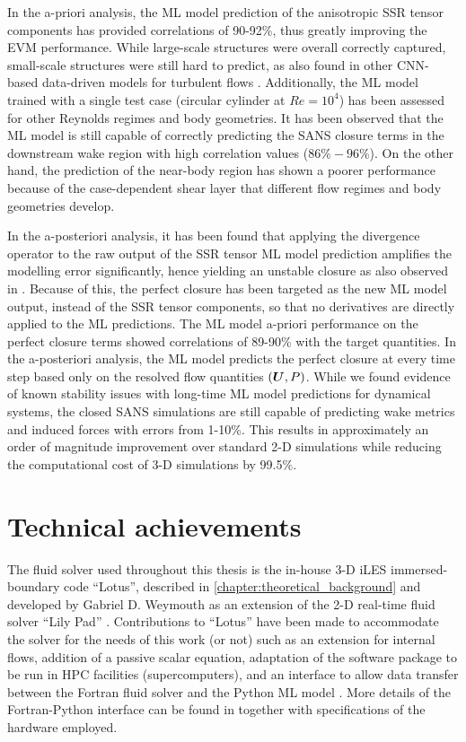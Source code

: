 \documentclass[../main.tex]{subfiles}
\begin{document}
In the a-priori analysis, the ML model prediction of the anisotropic SSR tensor components has provided correlations of 90-92\%, thus greatly improving the EVM performance.
While large-scale structures were overall correctly captured, small-scale structures were still hard to predict, as also found in other CNN-based data-driven models for turbulent flows \citep{Lee2019}.
Additionally, the ML model trained with a single test case (circular cylinder at $Re=10^4$) has been assessed for other Reynolds regimes and body geometries.
It has been observed that the ML model is still capable of correctly predicting the SANS closure terms in the downstream wake region with high correlation values ($86\%-96\%$).
On the other hand, the prediction of the near-body region has shown a poorer performance because of the case-dependent shear layer that different flow regimes and body geometries develop.

In the a-posteriori analysis, it has been found that applying the divergence operator to the raw output of the SSR tensor ML model prediction amplifies the modelling error significantly, hence yielding an unstable closure as also observed in \cite{Cruz2019}.
Because of this, the perfect closure has been targeted as the new ML model output, instead of the SSR tensor components, so that no derivatives are directly applied to the ML predictions.
The ML model a-priori performance on the perfect closure terms showed correlations of 89-90\% with the target quantities.
In the a-posteriori analysis, the ML model predicts the perfect closure at every time step based only on the resolved flow quantities $(\boldsymbol{U},P)$.
While we found evidence of known stability issues with long-time ML model predictions for dynamical systems, the closed SANS simulations are still capable of predicting wake metrics and induced forces with errors from 1-10\%.
This results in approximately an order of magnitude improvement over standard 2-D simulations while reducing the computational cost of 3-D simulations by 99.5\%.

\section{Technical achievements}

The fluid solver used throughout this thesis is the in-house 3-D iLES immersed-boundary code ``Lotus'', described in \cref{chapter:theoretical_background} and developed by Gabriel D. Weymouth as an extension of the 2-D real-time fluid solver ``Lily Pad'' \citep{Weymouth2015-LilyPad}.
Contributions to ``Lotus'' have been made to accommodate the solver for the needs of this work (or not) such as an extension for internal flows, addition of a passive scalar equation, adaptation of the software package to be run in HPC facilities (supercomputers), and an interface to allow data transfer between the Fortran fluid solver and the Python ML model \citep{Font2019-f2py}.
More details of the Fortran-Python interface can be found in  together with specifications of the hardware employed.
\end{document}
